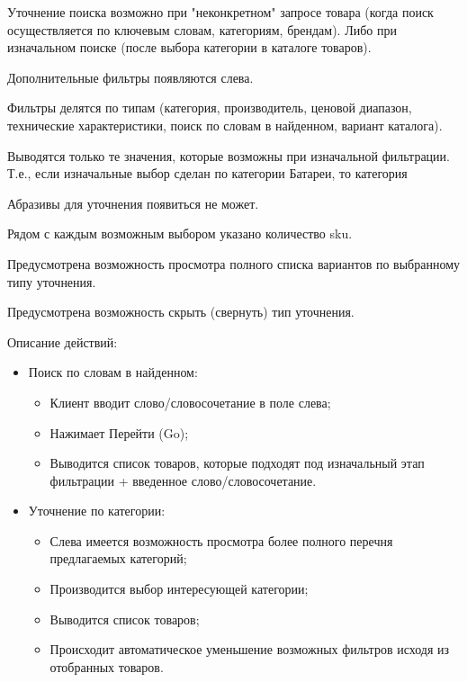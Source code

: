 {


\begin{wikilong}
Уточнение поиска возможно при "неконкретном" запросе товара (когда поиск осуществляется по ключевым словам, категориям, брендам). Либо при изначальном поиске (после выбора категории в каталоге товаров).

Дополнительные фильтры появляются слева.

Фильтры делятся по типам (категория, производитель, ценовой диапазон, технические характеристики, поиск по словам в найденном, вариант каталога).

Выводятся только те значения, которые возможны при изначальной фильтрации. Т.е., если изначальные выбор сделан по категории Батареи, то категория 

Абразивы для уточнения появиться не может.

Рядом с каждым возможным выбором указано количество sku.

Предусмотрена возможность просмотра полного списка вариантов по выбранному типу уточнения.

Предусмотрена возможность скрыть (свернуть) тип уточнения.

Описание действий:
\begin{itemize}
\item Поиск по словам в найденном:
	\begin{itemize}
		\item Клиент вводит слово/словосочетание в поле слева;
		\item Нажимает Перейти (Go);
		\item Выводится список товаров, которые подходят под изначальный этап фильтрации + введенное слово/словосочетание.
	\end{itemize}

\item Уточнение по категории:
	\begin{itemize}
		\item Слева имеется возможность просмотра более полного перечня предлагаемых категорий;
		\item Производится выбор интересующей категории;
		\item Выводится список товаров;
		\item Происходит автоматическое уменьшение возможных фильтров исходя из отобранных товаров.
	\end{itemize}


\end{itemize}
\end{wikilong}}
